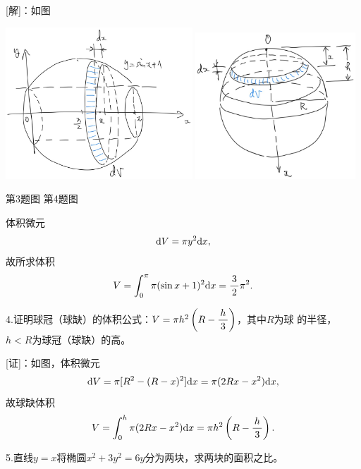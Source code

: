 [解]：如图
\begin{center}
	\includegraphics[width=7cm]{./images/ch6/sinx1cs.jpg}
	\includegraphics[width=6cm]{./images/ch6/topSp.jpg}
	
	{\kaishu 第3题图\hspace{6cm} 第4题图}
\end{center}
体积微元
$$\mathrm{d} V=\pi y^2\mathrm{d} x,$$
故所求体积
$$
	V=\displaystyle\int_0^{\pi}\pi(\sin x+1)^2\mathrm{d} x=\displaystyle\frac{\,{3}\,}{\,{2}\,}\pi^2.
$$
\fin

\bs

4.证明球冠（球缺）的体积公式：$V=\pi h^2\left(R-\displaystyle\frac{\,{h}\,}{\,{3}\,}\right)$，其中$R$为球
的半径，$h<R$为球冠（球缺）的高。

[证]：如图，体积微元
$$\mathrm{d} V=\pi[R^2-(R-x)^2]\mathrm{d} x=\pi(2Rx-x^2)\mathrm{d} x,$$
故球缺体积
$$V=\displaystyle\int_0^h\pi(2Rx-x^2)\mathrm{d} x=\pi h^2\left(R-\displaystyle\frac{\,{h}\,}{\,{3}\,}\right).$$
\fin

\bs

5.直线$y=x$将椭圆$x^2+3y^2=6y$分为两块，求两块的面积之比。

